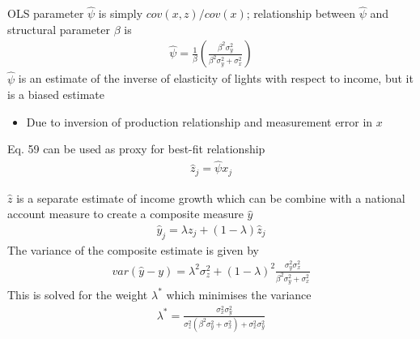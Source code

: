 \documentclass{beamer}
\begin{document}
\begin{frame}
 OLS parameter $\hat{\psi}$ is simply $cov(x,z)/ cov(x)$; relationship between $\hat{\psi}$ and structural parameter $\beta$ is
 \begin{align}
   \hat{\psi} = \frac{1}{\beta} \left( \frac{\beta^2 \sigma^2_y}{\beta^2 \sigma^2_y + \sigma^2_x}     \right)
 \end{align}
 \medskip
 $\hat{\psi}$ is an estimate of the inverse of elasticity of lights with respect to income, but it is a biased estimate
 \begin{itemize}
   \item Due to inversion of production relationship and measurement error in $x$
 \end{itemize}
 Eq. 59 can be used as proxy for best-fit relationship
 \begin{align}
   \hat{z}_j=\hat{\psi}x_j
 \end{align}  
\end{frame}

\begin{frame}
  $\hat{z}$ is a separate estimate of income growth which can be combine with a national account measure to create a composite measure $\hat{y}$
  \begin{align}
    \hat{y}_j=\lambda z_j + (1-\lambda)\hat{z}_j
  \end{align}
  The variance of the composite estimate is given by  
  \begin{align}
    var(\hat{y}-y)=\lambda^2\sigma^2_z + (1-\lambda)^2 \frac{\sigma^2_y \sigma^2_x}{\beta^2 \sigma^2_y + \sigma^2_x}
  \end{align}
  This is solved for the weight $\lambda^*$ which minimises the variance
  \begin{align}
    \lambda^* = \frac{\sigma^2_x \sigma^2_y}{\sigma^2_z(\beta^2 \sigma^2_y + \sigma^2_x) + \sigma^2_x \sigma^2_y}
  \end{align} 
\end{frame}
\end{document}
